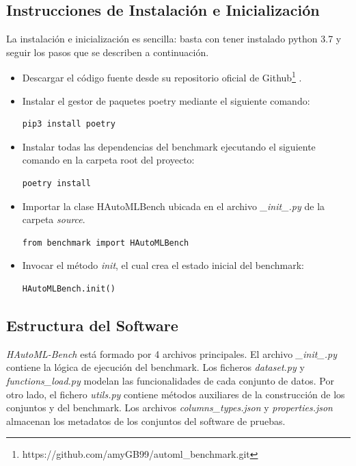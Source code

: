 \subsection{Instrucciones de Instalación e Inicialización}\label{subsection:instructions}
La instalación e inicialización es sencilla: basta con tener instalado python 3.7 y seguir los pasos que se describen a continuación.
\begin{itemize}
\item Descargar el código fuente desde su repositorio oficial de Github\footnote{https://github.com/amyGB99/automl\_benchmark.git} . 
\item Instalar el gestor de paquetes poetry mediante el siguiente comando:
\begin{lstlisting}[language = bash, caption= Instalar poetry]
pip3 install poetry
\end{lstlisting}   

\item Instalar todas las dependencias del benchmark ejecutando el siguiente comando en la carpeta root del proyecto: 
\begin{lstlisting}[language = bash, caption= Instalar dependencias]
poetry install
\end{lstlisting}  

\item Importar la clase HAutoMLBench ubicada en el archivo \textit{\_init\_.py} de la carpeta \textit{source}.
\begin{lstlisting}[caption= Importar HAutoMLBench,label = code:import]
from benchmark import HAutoMLBench
\end{lstlisting}

\item Invocar el método \textit{init}, el cual crea el estado inicial del benchmark: 
\begin{lstlisting}[caption= Invocar init ,label = code:init]
HAutoMLBench.init()
\end{lstlisting}

\end{itemize}

\subsection{Estructura del Software}\label{subsection:struct}


\textit{HAutoML-Bench} está formado por 4 archivos principales. El archivo \newline \textit{\_init\_.py} contiene la lógica de ejecución del benchmark.
Los ficheros \textit{dataset.py} y \textit{functions\_load.py} modelan las funcionalidades de cada conjunto de datos. Por otro lado, el fichero \textit{utils.py} 
contiene métodos auxiliares de la construcción de los conjuntos y del benchmark. 
Los archivos \textit{columns\_types.json} y \textit{properties.json} almacenan los metadatos de los conjuntos del software de pruebas. 
 
